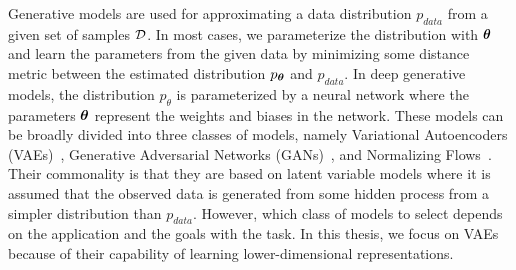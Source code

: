 Generative models are used for approximating a data distribution $p_{data}$ from a given set of samples ${\mathcal{D}}$. In most cases, we parameterize the distribution with ${\bm{\theta}}$ and learn the parameters from the given data by minimizing some distance metric between the estimated distribution $p_{{\bm{\theta}}}$ and $p_{data}$. In deep generative models, the distribution $p_{\theta}$ is parameterized by a neural network where the parameters ${\bm{\theta}}$ represent the weights and biases in the network. These models can be broadly divided into three classes of models, namely Variational Autoencoders (VAEs)~\cite{kingma2013auto}, Generative Adversarial Networks (GANs)~\cite{goodfellow2014generative}, and Normalizing Flows~\cite{rezende2015variational}. Their commonality is that they are based on latent variable models where it is assumed that the observed data is generated from some hidden process from a simpler distribution than $p_{data}$. However, which class of models to select depends on the application and the goals with the task. In this thesis, we focus on VAEs because of their capability of learning lower-dimensional representations.


